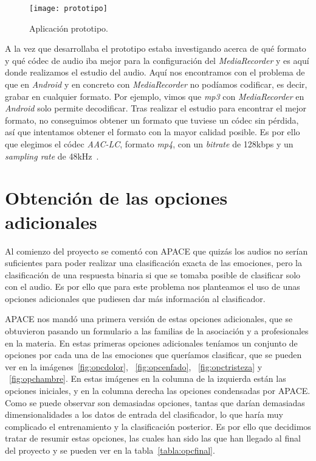 \begin{figure}
	\centering
	\texttt{[image: prototipo]}
	\caption{Aplicación prototipo.}
	\label{fig:prototipo}
\end{figure}

A la vez que desarrollaba el prototipo estaba investigando acerca de qué formato y qué códec de audio iba mejor para la configuración del \textit{MediaRecorder} y es aquí donde realizamos el estudio del audio. Aquí nos encontramos con el problema de que en \textit{Android} y en concreto con \textit{MediaRecorder} no podíamos codificar, es decir, grabar en cualquier formato. Por ejemplo, vimos que \textit{mp3} con \textit{MediaRecorder} en \textit{Android} solo permite decodificar. Tras realizar el estudio para encontrar el mejor formato, no conseguimos obtener un formato que tuviese un códec sin pérdida, así que intentamos obtener el formato con la mayor calidad posible. Es por ello que elegimos el códec \textit{AAC-LC}, formato \textit{mp4}, con un \textit{bitrate} de 128kbps y un \textit{sampling rate} de 48kHz~\cite{mediarecorder}.

\section{Obtención de las opciones adicionales}
Al comienzo del proyecto se comentó con APACE que quizás los audios no serían suficientes para poder realizar una clasificación exacta de las emociones, pero la clasificación de una respuesta binaria si que se tomaba posible de clasificar solo con el audio. Es por ello que para este problema nos planteamos el uso de unas opciones adicionales que pudiesen dar más información al clasificador.

APACE nos mandó una primera versión de estas opciones adicionales, que se obtuvieron pasando un formulario a las familias de la asociación y a profesionales en la materia. En estas primeras opciones adicionales teníamos un conjunto de opciones por cada una de las emociones que queríamos clasificar, que se pueden ver en la imágenes~\ref{fig:opcdolor}, ~\ref{fig:opcenfado}, ~\ref{fig:opctristeza} y ~\ref{fig:opchambre}. En estas imágenes en la columna de la izquierda están las opciones iniciales, y en la columna derecha las opciones condensadas por APACE. Como se puede observar son demasiadas opciones, tantas que darían demasiadas dimensionalidades a los datos de entrada del clasificador, lo que haría muy complicado el entrenamiento y la clasificación posterior. Es por ello que decidimos tratar de resumir estas opciones, las cuales han sido las que han llegado al final del proyecto y se pueden ver en la tabla~\ref{tabla:opcfinal}.


